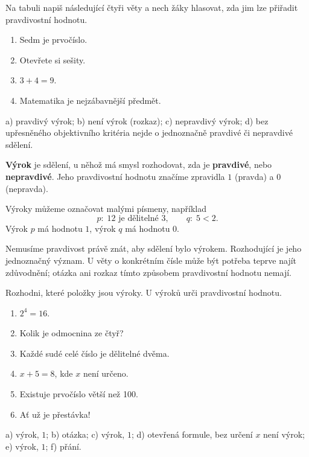 \documentclass[11pt,a4paper]{article}
\begin{document}
Na tabuli napiš následující čtyři věty a nech žáky hlasovat, zda jim lze přiřadit pravdivostní hodnotu.
\begin{prikladReseniBox}[title={Příklad 1}]
\begin{enumerate}[label=\alph*)]
  \item Sedm je prvočíslo.
  \item Otevřete si sešity.
  \item $3+4=9$.
  \item Matematika je nejzábavnější předmět.
\end{enumerate}
\tcblower
a) pravdivý výrok; b) není výrok (rozkaz); c) nepravdivý výrok; d) bez upřesněného objektivního kritéria nejde o jednoznačně pravdivé či nepravdivé sdělení.
\end{prikladReseniBox}

\begin{definiceBox}[title={Definice - Výrok}]
\textbf{Výrok} je sdělení, u něhož má smysl rozhodovat, zda je \textbf{pravdivé}, nebo \textbf{nepravdivé}. Jeho pravdivostní hodnotu značíme zpravidla $1$ (pravda) a $0$ (nepravda).
\end{definiceBox}

Výroky můžeme označovat malými písmeny, například
\[
  p:\; 12\text{ je dělitelné }3,\qquad q:\; 5<2.
\]
Výrok $p$ má hodnotu $1$, výrok $q$ má hodnotu $0$.


Nemusíme pravdivost právě znát, aby sdělení bylo výrokem.
Rozhodující je jeho jednoznačný význam. U věty o konkrétním čísle
může být potřeba teprve najít zdůvodnění; otázka ani rozkaz tímto
způsobem pravdivostní hodnotu nemají.

\begin{zadaniReseniBox}[title={Samostatná práce 1}]
Rozhodni, které položky jsou výroky. U výroků urči pravdivostní hodnotu.
\begin{enumerate}[label=\alph*)]
  \item $2^4=16$.
  \item Kolik je odmocnina ze čtyř?
  \item Každé sudé celé číslo je dělitelné dvěma.
  \item $x+5=8$, kde $x$ není určeno.
  \item Existuje prvočíslo větší než 100.
  \item Ať už je přestávka!
\end{enumerate}
\tcblower
a) výrok, $1$; b) otázka; c) výrok, $1$; d) otevřená formule, bez určení $x$ není výrok; e) výrok, $1$; f) přání.
\end{zadaniReseniBox}
\end{document}
